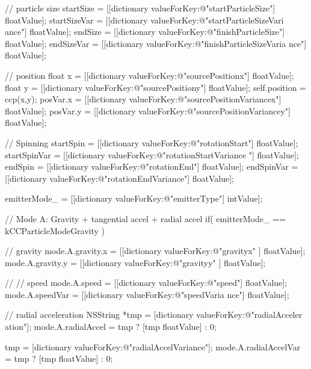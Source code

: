\begin{DoxyCode}
{{                // particle size
                startSize = [[dictionary valueForKey:@"startParticleSize"] 
      floatValue];
                startSizeVar = [[dictionary valueForKey:@"startParticleSizeVari
      ance"] floatValue];
                endSize = [[dictionary valueForKey:@"finishParticleSize"] 
      floatValue];
                endSizeVar = [[dictionary valueForKey:@"finishParticleSizeVaria
      nce"] floatValue];

                // position
                float x = [[dictionary valueForKey:@"sourcePositionx"] 
      floatValue];
                float y = [[dictionary valueForKey:@"sourcePositiony"] 
      floatValue];
                self.position = ccp(x,y);
                posVar.x = [[dictionary valueForKey:@"sourcePositionVariancex"]
       floatValue];
                posVar.y = [[dictionary valueForKey:@"sourcePositionVariancey"]
       floatValue];

                // Spinning
                startSpin = [[dictionary valueForKey:@"rotationStart"] 
      floatValue];
                startSpinVar = [[dictionary valueForKey:@"rotationStartVariance
      "] floatValue];
                endSpin = [[dictionary valueForKey:@"rotationEnd"] floatValue];
                endSpinVar = [[dictionary valueForKey:@"rotationEndVariance"] 
      floatValue];

                emitterMode_ = [[dictionary valueForKey:@"emitterType"] 
      intValue];

                // Mode A: Gravity + tangential accel + radial accel
                if( emitterMode_ == kCCParticleModeGravity ) {
                        // gravity
                        mode.A.gravity.x = [[dictionary valueForKey:@"gravityx"
      ] floatValue];
                        mode.A.gravity.y = [[dictionary valueForKey:@"gravityy"
      ] floatValue];

                        //
                        // speed
                        mode.A.speed = [[dictionary valueForKey:@"speed"] 
      floatValue];
                        mode.A.speedVar = [[dictionary valueForKey:@"speedVaria
      nce"] floatValue];

                        // radial acceleration
                        NSString *tmp = [dictionary valueForKey:@"radialAcceler
      ation"];
                        mode.A.radialAccel = tmp ? [tmp floatValue] : 0;

                        tmp = [dictionary valueForKey:@"radialAccelVariance"];
                        mode.A.radialAccelVar = tmp ? [tmp floatValue] : 0;

}}}
\end{DoxyCode}
